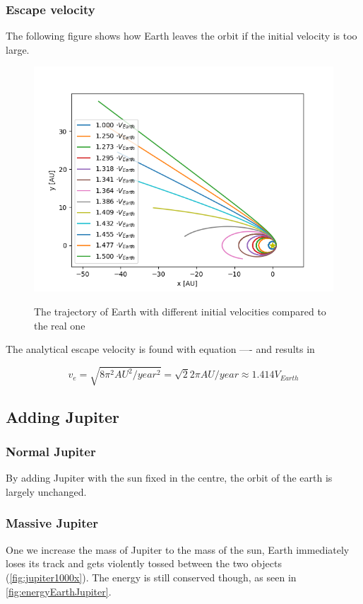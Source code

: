 \documentclass[10pt]{article}
\begin{document}
\begin{multicols}{2}
\subsubsection{Escape velocity}
The following figure
shows how Earth leaves the orbit if the initial velocity is too large.
\begin{figure}[H]
    \centering
    \includegraphics[width=1.0\linewidth]{../results/Esacpe_vel.png}
    \label{fig:name}
    \caption{The trajectory of Earth with different initial velocities compared to the real one}
\end{figure}

The analytical escape velocity is found with equation ---- and results in

\begin{equation}
    v_{e} = \sqrt{8\pi^2 AU^2/year^2} = \sqrt{2}2\pi AU/year \approx 1.414V_{Earth}\nonumber
\end{equation}


\subsection{Adding Jupiter}
\subsubsection{Normal Jupiter}
By adding Jupiter with the sun fixed in the centre, the orbit of the earth
is largely unchanged. 


\subsubsection{Massive Jupiter}
One we increase the mass of Jupiter to the mass of the sun, Earth
immediately loses its track and gets violently tossed between the two
objects (\cref{fig:jupiter1000x}). The energy is still conserved though,
as seen in \cref{fig:energyEarthJupiter}. 


\end{multicols}
\end{document}
